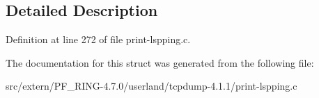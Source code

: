 \subsection{Detailed Description}


Definition at line 272 of file print-\/lspping.c.



The documentation for this struct was generated from the following file:\begin{DoxyCompactItemize}
\item 
src/extern/PF\_\-RING-\/4.7.0/userland/tcpdump-\/4.1.1/print-\/lspping.c\end{DoxyCompactItemize}
